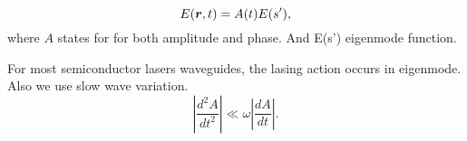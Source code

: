 \begin{equation}
	E(\mbox{\boldmath $r$}, t) = A(t) E(s'),
\end{equation}
where $A$ states for for both amplitude and phase. And E(s') eigenmode function.

For most semiconductor lasers waveguides, the lasing action occurs in eigenmode. Also we use slow wave variation.
\begin{equation}
	|\frac{d^2 A}{d t^2}| \ll \omega |\frac{d A}{d t}|.
\end{equation}